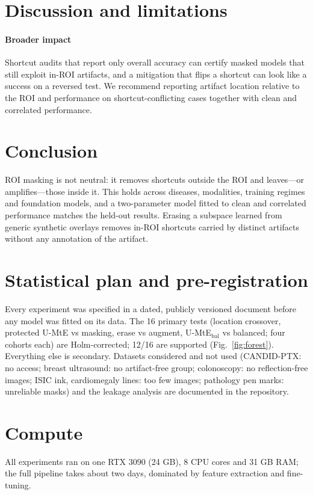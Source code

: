 \documentclass{article}
\newif\ifdupfloats\dupfloatstrue
\begin{document}
\section{Discussion and limitations}\label{m:discussion}\label{sec:limits}

\paragraph{Broader impact} Shortcut audits that report only overall accuracy can certify masked models that still
exploit in-ROI artifacts, and a mitigation that flips a shortcut can look like a success on a reversed test. We
recommend reporting artifact location relative to the ROI and performance on shortcut-conflicting cases together
with clean and correlated performance.

\section{Conclusion}
ROI masking is not neutral: it removes shortcuts outside the ROI and leaves---or amplifies---those inside it. This
holds across diseases, modalities, training regimes and foundation models, and a two-parameter model fitted to
clean and correlated performance matches the held-out results.
Erasing a subspace learned from generic synthetic overlays removes in-ROI shortcuts carried by distinct artifacts
without any annotation of the artifact.




\appendix
\dupfloatsfalse






\section{Statistical plan and pre-registration}\label{app:stats}
Every experiment was specified in a dated, publicly versioned document before any model was fitted on its data. The 16
primary tests (location crossover, protected U-MtE vs masking, erase vs augment, U-MtE$_{\text{bal}}$ vs balanced; four
cohorts each) are Holm-corrected; 12/16 are supported (Fig.~\ref{fig:forest}). Everything else is secondary. Datasets
considered and not used (CANDID-PTX: no access; breast ultrasound: no artifact-free group; colonoscopy: no
reflection-free images; ISIC ink, cardiomegaly lines: too few images; pathology pen marks: unreliable masks) and the
leakage analysis are documented in the repository.
\section{Compute}\label{app:compute}
All experiments ran on one RTX 3090 (24 GB), 8 CPU cores and 31 GB RAM; the full pipeline takes about two days,
dominated by feature extraction and fine-tuning.


\end{document}

